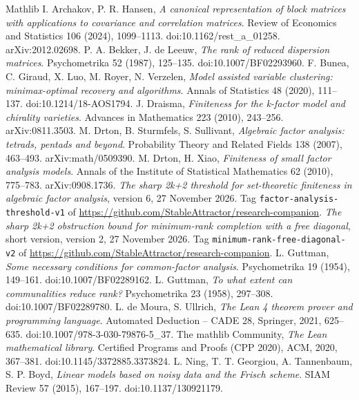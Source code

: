\documentclass[11pt,letterpaper,reqno]{amsart}
\theoremstyle{spaced}
\begin{document}
\begin{thebibliography}{Mathlib}
\footnotesize\linespread{1}\selectfont\setlength{\itemsep}{0pt}\setlength{\parskip}{0pt}
 I. Archakov, P. R. Hansen, \emph{A canonical representation of block matrices with applications to covariance and correlation matrices}. Review of Economics and Statistics 106 (2024), 1099--1113. doi:10.1162/rest\_a\_01258. arXiv:2012.02698.
 P. A. Bekker, J. de Leeuw, \emph{The rank of reduced dispersion matrices}. Psychometrika 52 (1987), 125--135. doi:10.1007/BF02293960.
 F. Bunea, C. Giraud, X. Luo, M. Royer, N. Verzelen, \emph{Model assisted variable clustering: minimax-optimal recovery and algorithms}. Annals of Statistics 48 (2020), 111--137. doi:10.1214/18-AOS1794.
 J. Draisma, \emph{Finiteness for the k-factor model and chirality varieties}. Advances in Mathematics 223 (2010), 243--256. arXiv:0811.3503.
 M. Drton, B. Sturmfels, S. Sullivant, \emph{Algebraic factor analysis: tetrads, pentads and beyond}. Probability Theory and Related Fields 138 (2007), 463--493. arXiv:math/0509390.
 M. Drton, H. Xiao, \emph{Finiteness of small factor analysis models}. Annals of the Institute of Statistical Mathematics 62 (2010), 775--783. arXiv:0908.1736.
 \emph{The sharp 2k+2 threshold for set-theoretic finiteness in algebraic factor analysis}, version 6, 27 November 2026. Tag \texttt{factor-analysis-threshold-v1} of \url{https://github.com/StableAttractor/research-companion}.
 \emph{The sharp 2k+2 obstruction bound for minimum-rank completion with a free diagonal}, short version, version 2, 27 November 2026. Tag \texttt{minimum-rank-free-diagonal-v2} of \url{https://github.com/StableAttractor/research-companion}.
 L. Guttman, \emph{Some necessary conditions for common-factor analysis}. Psychometrika 19 (1954), 149--161. doi:10.1007/BF02289162.
 L. Guttman, \emph{To what extent can communalities reduce rank?} Psychometrika 23 (1958), 297--308. doi:10.1007/BF02289780.
 L. de Moura, S. Ullrich, \emph{The Lean 4 theorem prover and programming language}. Automated Deduction -- CADE 28, Springer, 2021, 625--635. doi:10.1007/978-3-030-79876-5\_37.
 The mathlib Community, \emph{The Lean mathematical library}. Certified Programs and Proofs (CPP 2020), ACM, 2020, 367--381. doi:10.1145/3372885.3373824.
 L. Ning, T. T. Georgiou, A. Tannenbaum, S. P. Boyd, \emph{Linear models based on noisy data and the Frisch scheme}. SIAM Review 57 (2015), 167--197. doi:10.1137/130921179.

\end{thebibliography}
\end{document}
